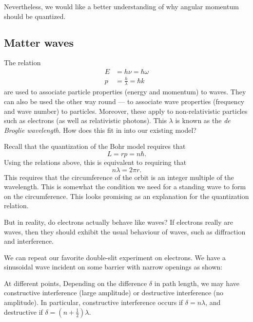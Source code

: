 \documentclass[a4paper]{article}
\begin{document}
Nevertheless, we would like a better understanding of why angular momentum should be quantized.

\subsection{Matter waves}
The relation
\begin{align*}
  E &= h\nu = \hbar \omega\\
  p &= \frac{h}{\lambda} = \hbar k
\end{align*}
are used to associate particle properties (energy and momentum) to waves. They can also be used the other way round --- to associate wave properties (frequency and wave number) to particles. Moreover, these apply to non-relativistic particles such as electrons (as well as relativistic photons). This $\lambda$ is known as the \emph{de Broglie wavelength}. How does this fit in into our existing model?

Recall that the quantization of the Bohr model requires that
\[
  L = rp = n\hbar.
\]
Using the relations above, this is equivalent to requiring that
\[
  n\lambda = 2\pi r.
\]
This requires that the circumference of the orbit is an integer multiple of the wavelength. This is somewhat the condition we need for a standing wave to form on the circumference. This looks promising as an explanation for the quantization relation.

But in reality, do electrons actually behave like waves? If electrons really are waves, then they should exhibit the usual behaviour of waves, such as diffraction and interference.

We can repeat our favorite double-slit experiment on electrons. We have a sinusoidal wave incident on some barrier with narrow openings as shown:
\begin{center}
\end{center}
At different points, Depending on the difference $\delta$ in path length, we may have constructive interference (large amplitude) or destructive interference (no amplitude). In particular, constructive interference occurs if $\delta = n\lambda$, and destructive if $\delta = (n + \frac{1}{2})\lambda$.
\end{document}
